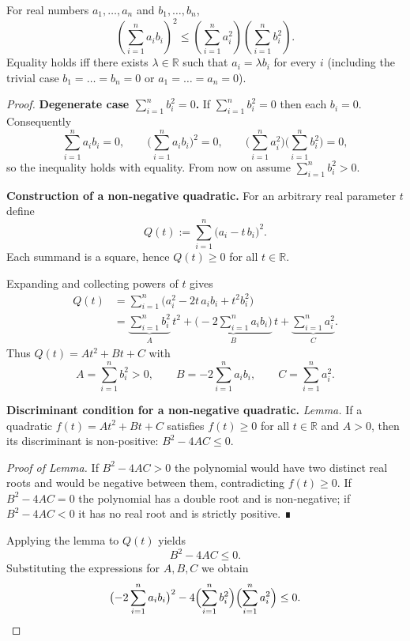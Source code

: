 \begin{theorem}
For real numbers \(a_{1},\dots ,a_{n}\) and \(b_{1},\dots ,b_{n}\),
\[
\left(\sum_{i=1}^{n}a_{i}b_{i}\right)^{2}
\le
\left(\sum_{i=1}^{n}a_{i}^{2}\right)
\left(\sum_{i=1}^{n}b_{i}^{2}\right).
\]
Equality holds iff there exists \(\lambda\in\mathbb{R}\) such that
\(a_{i}=\lambda b_{i}\) for every \(i\) (including the trivial case
\(b_{1}=\dots =b_{n}=0\) or \(a_{1}=\dots =a_{n}=0\)).
\end{theorem}

\begin{proof}
\textbf{Degenerate case \(\displaystyle\sum_{i=1}^{n}b_{i}^{2}=0\).}
If \(\sum_{i=1}^{n}b_{i}^{2}=0\) then each \(b_{i}=0\). Consequently
\[
\sum_{i=1}^{n}a_{i}b_{i}=0,\qquad
\bigl(\sum_{i=1}^{n}a_{i}b_{i}\bigr)^{2}=0,\qquad
\bigl(\sum_{i=1}^{n}a_{i}^{2}\bigr)
\bigl(\sum_{i=1}^{n}b_{i}^{2}\bigr)=0,
\]
so the inequality holds with equality.  
From now on assume \(\displaystyle\sum_{i=1}^{n}b_{i}^{2}>0\).

\medskip
\textbf{Construction of a non‑negative quadratic.}
For an arbitrary real parameter \(t\) define
\[
Q(t):=\sum_{i=1}^{n}\bigl(a_{i}-t\,b_{i}\bigr)^{2}.
\]
Each summand is a square, hence \(Q(t)\ge0\) for all \(t\in\mathbb{R}\).

Expanding and collecting powers of \(t\) gives
\begin{align*}
Q(t)&=\sum_{i=1}^{n}\bigl(a_{i}^{2}-2t\,a_{i}b_{i}+t^{2}b_{i}^{2}\bigr)\\
    &=\underbrace{\sum_{i=1}^{n}b_{i}^{2}}_{A}\,t^{2}
      +\underbrace{\bigl(-2\sum_{i=1}^{n}a_{i}b_{i}\bigr)}_{B}\,t
      +\underbrace{\sum_{i=1}^{n}a_{i}^{2}}_{C}.
\end{align*}
Thus \(Q(t)=At^{2}+Bt+C\) with
\[
A=\sum_{i=1}^{n}b_{i}^{2}>0,\qquad
B=-2\sum_{i=1}^{n}a_{i}b_{i},\qquad
C=\sum_{i=1}^{n}a_{i}^{2}.
\]

\medskip
\textbf{Discriminant condition for a non‑negative quadratic.}
\emph{Lemma.} If a quadratic \(f(t)=At^{2}+Bt+C\) satisfies \(f(t)\ge0\) for
all \(t\in\mathbb{R}\) and \(A>0\), then its discriminant is non‑positive:
\(B^{2}-4AC\le0\).

\emph{Proof of Lemma.} If \(B^{2}-4AC>0\) the polynomial would have two
distinct real roots and would be negative between them, contradicting
\(f(t)\ge0\).  If \(B^{2}-4AC=0\) the polynomial has a double root and is
non‑negative; if \(B^{2}-4AC<0\) it has no real root and is strictly
positive.  ∎

Applying the lemma to \(Q(t)\) yields
\[
B^{2}-4AC\le0.
\]
Substituting the expressions for \(A,B,C\) we obtain
\[
\bigl(-2\sum_{i=1}^{n}a_{i}b_{i}\bigr)^{2}
-4\Bigl(\sum_{i=1}^{n}b_{i}^{2}\Bigr)
   \Bigl(\sum_{i=1}^{n}a_{i}^{2}\Bigr)\le0.
\]


\end{proof}
